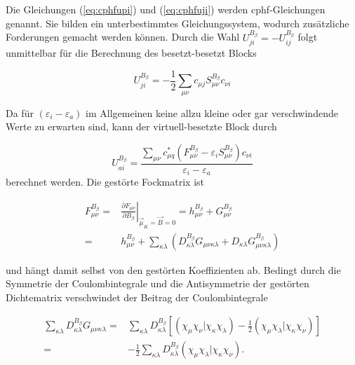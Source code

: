     
    Die Gleichungen (\ref{eq:cphfupi}) und (\ref{eq:cphfuji}) werden \ac{cphf}-Gleichungen genannt.\supercite{gerratt1968force} Sie bilden ein unterbestimmtes Gleichungssystem, wodurch zusätzliche Forderungen gemacht werden können.\supercite{weigendphdthesis} Durch die Wahl  $U_{ji}^{B_\beta}=-U_{ij}^{B_\beta}$ folgt unmittelbar für die Berechnung des besetzt-besetzt Blocks
    
    \begin{equation}\label{eq:uji}
    U_{ji}^{B_\beta}=-\frac{1}{2}\sum_{\mu\nu}c_{\mu j}S_{\mu\nu}^{B_\beta}c_{\nu i}
    \end{equation}
    
    Da für $\left(\varepsilon_i-\varepsilon_a\right)$ im Allgemeinen keine allzu kleine oder gar verschwindende Werte zu erwarten sind, kann der virtuell-besetzte Block durch
    
    \begin{equation}\label{eq:uai}
    U_{ai}^{B_\beta}=\frac{\sum_{\mu\nu}c_{\mu q}^*\left(F_{\mu\nu}^{B_\beta}-\varepsilon_i S_{\mu\nu}^{B_\beta}\right)c_{\nu i}}{\varepsilon_i-\varepsilon_a}
    \end{equation}
    berechnet werden. Die gestörte Fockmatrix ist
    
    \begin{equation}
    \begin{aligned}
    F_{\mu\nu}^{B_\beta}=&\left.\frac{\partial F_{\mu\nu}}{\partial B_\beta}\right\vert_{\vec{\mu}_K=\vec{B}=0}=h_{\mu\nu}^{B_\beta}+G_{\mu\nu}^{B_\beta}\\
    =&h_{\mu\nu}^{B_\beta}+\sum_{\kappa\lambda}\left(D_{\kappa\lambda}^{B_\beta}G_{\mu\nu\kappa\lambda}+D_{\kappa\lambda}G_{\mu\nu\kappa\lambda}^{B_\beta}\right)
    \end{aligned}
    \end{equation}
    
    und hängt damit selbst von den gestörten Koeffizienten ab. Bedingt durch die Symmetrie der Coulombintegrale und die Antisymmetrie der gestörten Dichtematrix verschwindet der Beitrag der Coulombintegrale 
    
    \begin{equation}
    \begin{aligned}
    \sum_{\kappa\lambda}D_{\kappa\lambda}^{B_\beta}G_{\mu\nu\kappa\lambda}=& \sum_{\kappa\lambda}D_{\kappa\lambda}^{B_\beta}\left[\left(\chi_{\mu}\chi_{\nu}|\chi_{\kappa}\chi_{\lambda}\right)-\frac{1}{2}\left(\chi_{\mu}\chi_{\lambda}|\chi_{\kappa}\chi_{\nu}\right)\right] \\
    =&-\frac{1}{2}\sum_{\kappa\lambda}D_{\kappa\lambda}^{B_\beta}\left(\chi_{\mu}\chi_{\lambda}|\chi_{\kappa}\chi_{\nu}\right).
    \end{aligned}
    \end{equation}
    
